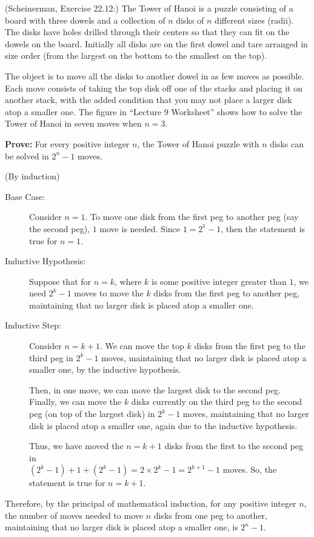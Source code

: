 \documentclass{article}
\theoremstyle{definition}
\begin{document}
\begin{question}
    (Scheinerman, Exercise 22.12:) 
    The Tower of Hanoi is a puzzle consisting of a board with three dowels and a collection of $n$ disks of $n$ different sizes (radii).  The disks have holes drilled through their centers so that they can fit on the dowels on the board.  Initially all disks are on the first dowel and tare arranged in size order (from the largest on the bottom to the smallest on the top).

    The object is to move all the disks to another dowel in as few moves as possible.  Each move consists of taking the top disk off one of the stacks and placing it on another stack, with the added condition that you may not place a larger disk atop a smaller one.  The figure in ``Lecture 9 Worksheet'' shows how to solve the Tower of Hanoi in seven moves when $n = 3$.
    
    \textbf{Prove:}  For every positive integer $n$, the Tower of Hanoi puzzle with $n$ disks can be solved in $2^n-1$ moves.
\end{question}
	\begin{solution}(By induction)
	\begin{description}
	\item[Base Case: ]  Consider $n= 1$.  To move one disk from the first peg to another peg (say the second peg), $1$ move is needed.  Since $1 = 2^1 -1$, then the statement is true for $n=1$.
	\item[Inductive Hypothesis: ] Suppose that for $n = k$, where $k$ is some positive integer greater than $1$, we need $2^k - 1$ moves to move the $k$ disks from the first peg to another peg, maintaining that no larger disk is placed atop a smaller one.
	\item[Inductive Step: ] Consider $n = k+1$.  We can move the top $k$ disks from the first peg to the third peg in $2^k-1$ moves, maintaining that no larger disk is placed atop a smaller one, by the inductive hypothesis.  

	Then, in one move, we can move the largest disk to the second peg.  Finally, we can move the $k$ disks currently on the third peg to the second peg (on top of the largest disk) in $2^k-1$ moves, maintaining that no larger disk is placed atop a smaller one, again due to the inductive hypothesis.

	Thus, we have moved the $n = k+1$ disks from the first to the second peg in\\ $(2^k-1) + 1 + (2^k-1) = 2\times 2^k -1 = 2^{k+1} - 1$ moves.  So, the statement is true for $n = k+1$.
	\end{description}
	Therefore, by the principal of mathematical induction, for any positive integer $n$, the number of moves needed to move $n$ disks from one peg to another, maintaining that no larger disk is placed atop a smaller one, is $2^n - 1$.
\end{solution}
\end{document}

